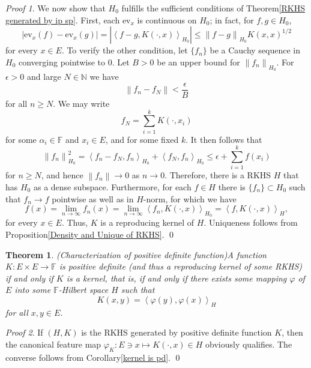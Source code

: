 \documentclass[a4paper,12pt]{article}
\newtheorem{thm}{Theorem}[section]
\theoremstyle{remark}
\newtheorem*{prf}{Proof}
\theoremstyle{definition}
\theoremstyle{definition}
\theoremstyle{definition}
\newcommand{\ip}[2]{\left<#1, #2 \right>}
\newcommand{\abs}[1]{\left| #1 \right|}
\newcommand{\norm}[1]{\left\| #1 \right\|}
\newcommand{\ev}[1]{\mathrm{ev}_{#1}}
\begin{document}
\begin{prf}
	We now show that \( H_0 \) fulfills the sufficient conditions of Theorem\ref{RKHS generated by ip sp}. First, each \( \ev{x} \) is continuous on \( H_0 \); in fact, for \( f, g \in H_0 \),
	\begin{equation*}
		\abs{\ev{x}(f)- \ev{x}(g)} = \abs{\ip{f-g}{K(\cdot ,x)}_{H_0}} \le \norm{f-g}_{H_0}K(x,x)^{1/2}
	\end{equation*}
	for every \( x \in E \). To verify the other condition, let \( \{f_n\} \) be a Cauchy sequence in \( H_0 \) converging pointwise to 0. Let \( B>0 \) be an upper bound for \( \norm{f_n}_{H_0} \). For \( \epsilon>0 \) and large \( N \in \mathbb{N} \) we have
	\begin{equation*}
		\norm{f_n - f_N} < \frac{\epsilon}{B}
	\end{equation*}
	for all \( n \ge N \). We may write
	\begin{equation*}
		f_N = \sum_{i=1}^{k} K(\cdot ,x_i)
	\end{equation*}
	for some \( \alpha_i \in \mathbb{F} \) and \( x_i \in E \), and for some fixed \( k \). It then follows that
	\begin{equation*}
		\norm{f_n}^2_{H_0} = \ip{f_n- f_N}{f_n}_{H_0} + \ip{f_N}{f_n}_{H_0}
		\le \epsilon + \sum_{i=1}^{k}f(x_i)
	\end{equation*}
	for \( n \ge N \), and hence \( \norm{f_n}\to 0 \) as \( n \to 0 \). Therefore, there is a RKHS \( H \) that has \( H_0 \) as a dense subspace.
	Furthermore, for each \( f \in H \) there is \( \{f_n\} \subset H_0 \) such that \( f_n \to f \) pointwise as well as in \( H \)-norm, for which we have
	\begin{equation*}
		f(x) = \lim_{n \to \infty} f_n(x)= \lim_{n \to \infty} \ip{f_n}{K(\cdot ,x)}_{H_0} = \ip{f}{K(\cdot ,x)}_H,
	\end{equation*}
	for every \( x \in E \). Thus, \( K \) is a reproducing kernel of \( H \). Uniqueness follows from Proposition\ref{Density and Unique of RKHS}.
	\qed\end{prf}

\begin{thm} (Characterization of positive definite function)\label{Characterization of pd}
	A function \( K:E \times E \to \mathbb{F} \) is positive definite (and thus a reproducing kernel of some RKHS) if and only if \( K \) is a kernel, that is, if and only if there exists some mapping \( \varphi \) of \( E \) into some  \( \mathbb{F} \)-Hilbert space \( H \) such that
	\begin{equation*}
		K(x,y) = \ip{\varphi(y)}{\varphi(x)}_H
	\end{equation*}
	for all \( x,y \in E \).
\end{thm}
\begin{prf}
	If \( (H,K) \) is the RKHS generated by positive definite function \( K \), then the canonical feature map \( \varphi_K:E \ni x \mapsto K(\cdot ,x) \in H \) obviously qualifies. The converse follows from Corollary\ref{kernel is pd}.
	\qed\end{prf}
\end{document}
